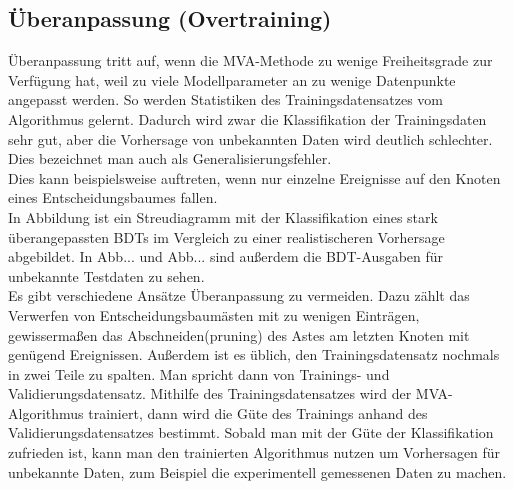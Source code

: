 

\subsection{\"Uberanpassung (Overtraining)}
\label{ch:Algorithmen:subsec:overtraining}

\"Uberanpassung tritt auf, wenn die MVA-Methode zu wenige Freiheitsgrade zur Verf\"ugung hat, weil zu viele Modellparameter an zu wenige Datenpunkte angepasst werden. So werden Statistiken des Trainingsdatensatzes vom Algorithmus gelernt. Dadurch wird zwar die Klassifikation der Trainingsdaten sehr gut, aber die Vorhersage von unbekannten Daten wird deutlich schlechter. Dies bezeichnet man auch als Generalisierungsfehler.\\
Dies kann beispielsweise auftreten, wenn nur einzelne Ereignisse auf den Knoten eines Entscheidungsbaumes fallen.\\
In Abbildung  ist ein Streudiagramm mit der Klassifikation eines stark \"uberangepassten BDTs im Vergleich zu einer realistischeren Vorhersage abgebildet. In Abb... und Abb...  sind au\ss erdem die BDT-Ausgaben f\"ur unbekannte Testdaten zu sehen.\\
Es gibt verschiedene Ans\"atze \"Uberanpassung zu vermeiden. Dazu z\"ahlt das Verwerfen von Entscheidungsbaum\"asten mit zu wenigen Eintr\"agen, gewisserma\ss en das \glqq Abschneiden\grqq (pruning) des Astes am letzten Knoten mit gen\"ugend Ereignissen. Au\ss erdem ist es \"ublich, den Trainingsdatensatz nochmals in zwei Teile zu spalten. Man spricht dann von Trainings- und Validierungsdatensatz. Mithilfe des Trainingsdatensatzes wird der MVA-Algorithmus trainiert, dann wird die G\"ute des Trainings anhand des Validierungsdatensatzes bestimmt. Sobald man mit der G\"ute der Klassifikation zufrieden ist, kann man den trainierten Algorithmus nutzen um Vorhersagen f\"ur unbekannte Daten, zum Beispiel die experimentell gemessenen Daten zu machen.

